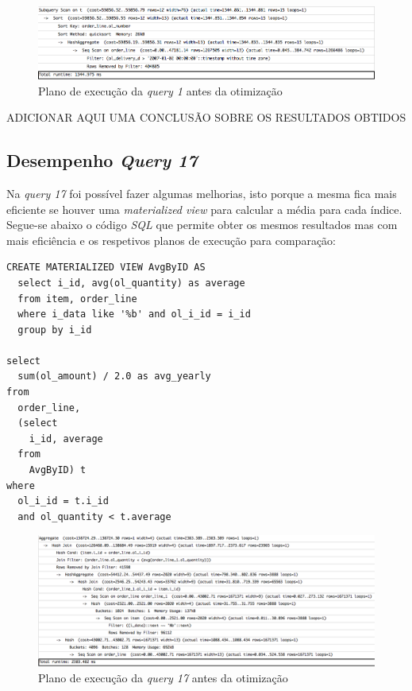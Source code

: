 \begin{figure}[ht!]
\centering
\includegraphics[width=\textwidth]{img/00_query1_ant}
\caption{Plano de execução da \textit{query 1} antes da otimização \label{overflow}}
\end{figure}

ADICIONAR AQUI UMA CONCLUSÃO SOBRE OS RESULTADOS OBTIDOS

\newpage

\subsection{Desempenho \textit{Query 17}}

Na \textit{query 17} foi possível fazer algumas melhorias, isto porque a mesma fica mais eficiente se houver uma \textit{materialized view} para calcular a média para cada índice. Segue-se abaixo o código \textit{SQL} que permite obter os mesmos resultados mas com mais eficiência e os respetivos planos de execução para comparação:

\begin{verbatim}
CREATE MATERIALIZED VIEW AvgByID AS
  select i_id, avg(ol_quantity) as average
  from item, order_line
  where i_data like '%b' and ol_i_id = i_id
  group by i_id

select
  sum(ol_amount) / 2.0 as avg_yearly
from
  order_line,
  (select
    i_id, average
  from
    AvgByID) t
where
  ol_i_id = t.i_id
  and ol_quantity < t.average
\end{verbatim}

\begin{figure}[ht!]
\centering
\includegraphics[width=\textwidth]{img/00_query17_ant}
\caption{Plano de execução da \textit{query 17} antes da otimização \label{overflow}}
\end{figure}

